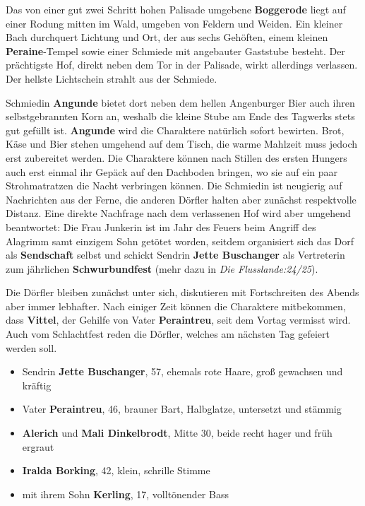 Das von einer gut zwei Schritt hohen Palisade umgebene \textbf{Boggerode} liegt auf einer Rodung mitten im Wald, umgeben von Feldern und Weiden.
Ein kleiner Bach durchquert Lichtung und Ort, der aus sechs Gehöften, einem kleinen \textbf{Peraine}-Tempel sowie einer Schmiede mit angebauter Gaststube besteht.
Der prächtigste Hof, direkt neben dem Tor in der Palisade, wirkt allerdings verlassen.
Der hellste Lichtschein strahlt aus der Schmiede.
\begin{center}
\end{center}

Schmiedin \textbf{Angunde} bietet dort neben dem hellen Angenburger Bier auch ihren selbstgebrannten Korn an, weshalb die kleine Stube am Ende des Tagwerks stets gut gefüllt ist.
\textbf{Angunde} wird die Charaktere natürlich sofort bewirten.
Brot, Käse und Bier stehen umgehend auf dem Tisch, die warme Mahlzeit muss jedoch erst zubereitet werden.
Die Charaktere können nach Stillen des ersten Hungers auch erst einmal ihr Gepäck auf den Dachboden bringen, wo sie auf ein paar Strohmatratzen die Nacht verbringen können.
Die Schmiedin ist neugierig auf Nachrichten aus der Ferne, die anderen Dörfler halten aber zunächst respektvolle Distanz.
Eine direkte Nachfrage nach dem verlassenen Hof wird aber umgehend beantwortet:
Die Frau Junkerin ist im Jahr des Feuers beim Angriff des Alagrimm samt einzigem Sohn getötet worden, seitdem organisiert sich das Dorf als \textbf{Sendschaft} selbst und schickt Sendrin \textbf{Jette Buschanger} als Vertreterin zum jährlichen \textbf{Schwurbundfest} (mehr dazu in \emph{Die Flusslande:24/25}).


Die Dörfler bleiben zunächst unter sich, diskutieren mit Fortschreiten des Abends aber immer lebhafter.
Nach einiger Zeit können die Charaktere mitbekommen, dass \textbf{Vittel}, der Gehilfe von Vater \textbf{Peraintreu}, seit dem Vortag vermisst wird.
Auch vom Schlachtfest reden die Dörfler, welches am nächsten Tag gefeiert werden soll.

\begin{itemize}
	\item Sendrin \textbf{Jette Buschanger}, 57, ehemals rote Haare, groß gewachsen und kräftig
	\item Vater \textbf{Peraintreu}, 46, brauner Bart, Halbglatze, untersetzt und stämmig
	\item \textbf{Alerich} und \textbf{Mali Dinkelbrodt}, Mitte 30, beide recht hager und früh ergraut
	\item \textbf{Iralda Borking}, 42, klein, schrille Stimme
	\item mit ihrem Sohn \textbf{Kerling}, 17, volltönender Bass
\end{itemize}

